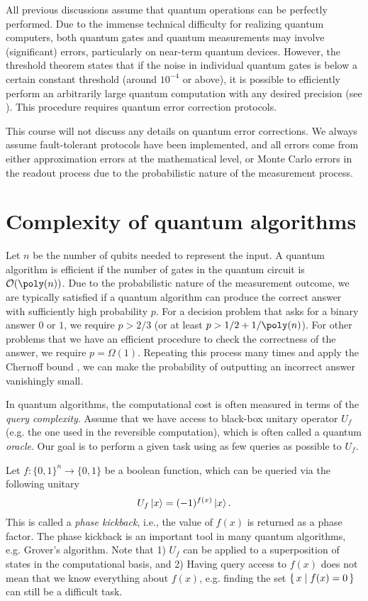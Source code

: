 All previous discussions assume that quantum operations can be perfectly performed. Due to the immense technical difficulty for realizing quantum computers, both quantum gates and quantum measurements may involve (significant) errors, particularly on near-term quantum devices. However, the threshold theorem states that if the noise in individual quantum gates is below a certain constant threshold (around $10^{-4}$ or above), it is possible to efficiently perform an arbitrarily large quantum computation with any desired precision (see \cite[Section 10.6]{NielsenChuang2000}). This procedure requires quantum error correction protocols. 

This course will not discuss any details on quantum error corrections. We always assume fault-tolerant protocols have been implemented, and all errors come from either approximation errors at the mathematical level, or Monte Carlo errors in the readout process due to the probabilistic nature of the measurement process.

\section{Complexity of quantum algorithms}


Let $n$ be the number of qubits needed to represent the input. A quantum algorithm is efficient if the number of gates in the quantum circuit is $\Or(\poly(n))$. Due to the probabilistic nature of the measurement outcome, we are typically satisfied if a quantum algorithm can produce the correct answer with sufficiently high probability $p$.
For a decision problem that asks for a binary answer $0$ or $1$, we require $p>2/3$ (or at least $p > 1/2+1/\poly(n)$).
For other problems that we have an efficient procedure to check the correctness of the answer, we require $p=\Omega(1)$. Repeating this process many times and apply the Chernoff bound \cite[Box 3.4]{NielsenChuang2000}, we can make the probability of outputting an incorrect answer vanishingly small.

In quantum algorithms, the computational cost is often measured in terms of the \textit{query complexity}. Assume that we have access to black-box unitary operator $U_f$ (e.g. the one used in the reversible computation), which is often called a quantum \emph{oracle}. 
Our goal is to perform a given task using as few queries as possible to $U_f$.


\begin{exam}
Let $f:\{0,1\}^n\to\{0,1\}$ be a boolean function, which can be queried via the following unitary
\begin{equation}
U_f\ket{x}=(-1)^{f(x)}\ket{x}.
\label{eqn:phase_kickback}
\end{equation} 
This is called a \emph{phase kickback}, i.e., the value of $f(x)$ is returned as a phase factor. 
The phase kickback is an important tool in many quantum algorithms, e.g. Grover's algorithm. 
Note that 1) $U_f$ can be applied to a superposition of states in the computational basis, and 2) Having query access to $f(x)$ does not mean that we know everything about $f(x)$, e.g. finding the set $\set{x|f(x)=0}$ can still be a difficult task.
\end{exam}

